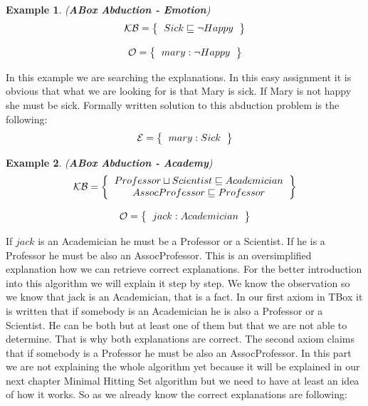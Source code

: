 \documentclass[12pt,a4paper]{article}
\newtheorem{example}{Example}[subsection]
\begin{document}
\begin{example}{(\textbf{ABox Abduction - Emotion})}
	\[ 
	\mathcal{KB} = \left\{
	\begin{tabular}{c c}
	$Sick \sqsubseteq \neg Happy$
	\end{tabular}
	\right \}
	\]
	
	\[ 
	\mathcal{O} = \left\{
	\begin{tabular}{c c}
	$mary : \neg Happy$
	\end{tabular}
	\right \}
	\]								
\end{example}

In this example we are searching the explanations. In this easy assignment it is obvious that what we are looking for is that Mary is sick. If Mary is not happy she must be sick. Formally written solution to this abduction problem is the following:
\[ 
\mathcal{E} = \left\{
\begin{tabular}{c c}
$mary : Sick$
\end{tabular}
\right \}
\]

\begin{example}{(\textbf{ABox Abduction - Academy})}
	\[ 
	\mathcal{KB} = \left\{
	\begin{tabular}{c c}
		$Professor \sqcup Scientist \sqsubseteq Academician$ \\
		$AssocProfessor \sqsubseteq Professor$ \\
	\end{tabular}
	\right \}
	\]
	
	\[ 
	\mathcal{O} = \left\{
	\begin{tabular}{c c}
		$jack : Academician$
	\end{tabular}
	\right \}
	\]								
	
\end{example}

If $jack$ is an Academician he must be a Professor or a Scientist. If he is a Professor he must be also an AssocProfessor. This is an oversimplified explanation how we can retrieve correct explanations. For the better introduction into this algorithm we will explain it step by step. We know the observation so we know that jack is an Academician, that is a fact. In our first axiom in TBox it is written that if somebody is an Academician he is also a Professor or a Scientist. He can be both but at least one of them but that we are not able to determine. That is why both explanations are correct. The second axiom claims that if somebody is a Professor he must be also an AssocProfessor. In this part we are not explaining the whole algorithm yet because it will be explained in our next chapter Minimal Hitting Set algorithm but we need to have at least an idea of how it works. So as we already know the correct explanations are following:
\end{document}
